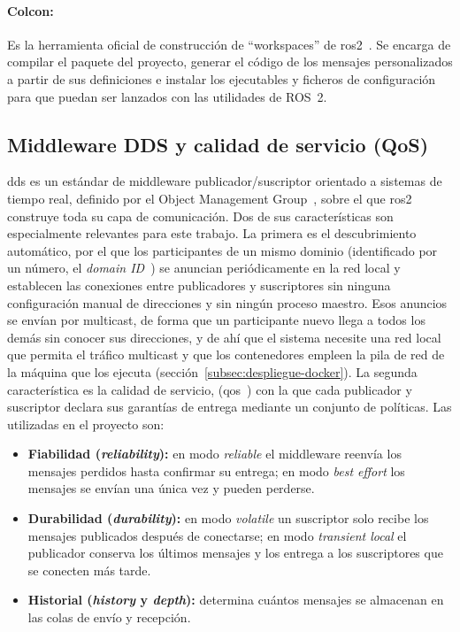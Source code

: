 \paragraph{Colcon:}
\label{sec:ros2-colcon}
Es la herramienta oficial de construcción de ``workspaces'' de \gls{ros2}~\cite{colcon}.  Se encarga de compilar el paquete del proyecto, generar el código de los mensajes personalizados a partir de sus definiciones e instalar los ejecutables y ficheros de configuración para que puedan ser lanzados con las utilidades de ROS~2.



\subsection{Middleware DDS y calidad de servicio (QoS)}
\label{sec:dds-qos}

\gls{dds} es un estándar de middleware publicador/suscriptor orientado a sistemas de tiempo real, definido por el Object Management Group~\cite{ddsspec}, sobre el que \gls{ros2} construye toda su capa de comunicación. Dos de sus características son especialmente relevantes para este trabajo. La primera es el descubrimiento automático, por el que los participantes de un mismo dominio (identificado por un número, el \textit{domain ID}~\cite{ros2domainid}) se anuncian periódicamente en la red local y establecen las conexiones entre publicadores y suscriptores sin ninguna configuración manual de direcciones y sin ningún proceso maestro. Esos anuncios se envían por multicast, de forma que un participante nuevo llega a todos los demás sin conocer sus direcciones, y de ahí que el sistema necesite una red local que permita el tráfico multicast y que los contenedores empleen la pila de red de la máquina que los ejecuta (sección~\ref{subsec:despliegue-docker}). La segunda característica es la calidad de servicio, (\gls{qos}~\cite{ros2qos}) con la que cada publicador y suscriptor declara sus garantías de entrega mediante un conjunto de políticas. Las utilizadas en el proyecto son:

\begin{itemize}
\item \textbf{Fiabilidad (\textit{reliability}):} en modo \textit{reliable} el middleware reenvía los mensajes perdidos hasta confirmar su entrega; en modo \textit{best effort} los mensajes se envían una única vez y pueden perderse.

\item \textbf{Durabilidad (\textit{durability}):} en modo \textit{volatile} un suscriptor solo recibe los mensajes publicados después de conectarse; en modo \textit{transient local} el publicador conserva los últimos mensajes y los entrega a los suscriptores que se conecten más tarde.

\item \textbf{Historial (\textit{history} y \textit{depth}):} determina cuántos mensajes se almacenan en las colas de envío y recepción.
\end{itemize}

